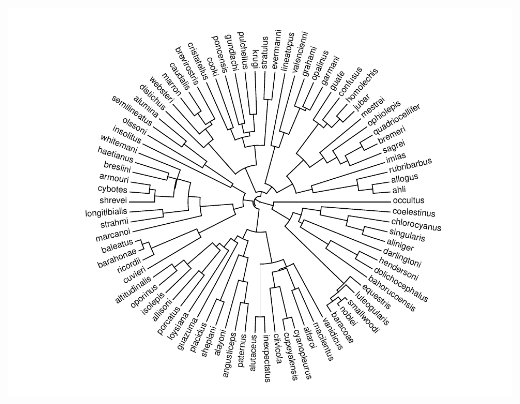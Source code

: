 \documentclass[
]{article}
\begin{document}
\includegraphics{w01-IntroR-RStudio-Markdown_files/figure-latex/unnamed-chunk-8-1.pdf}
\end{document}
